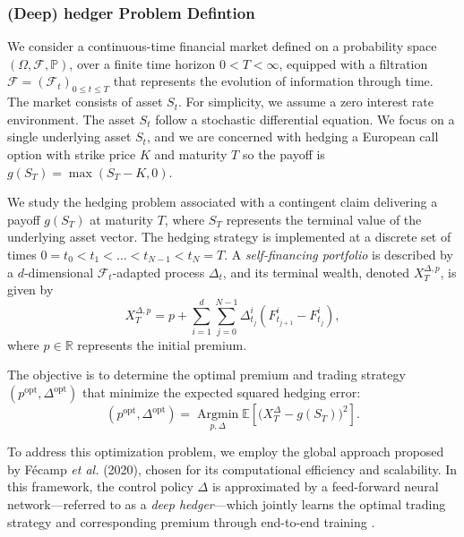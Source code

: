     \subsubsection{(Deep) hedger Problem Defintion}
      We consider a continuous-time financial market defined on a 
      probability space $(\Omega, \mathcal{F}, \mathbb{P})$, over 
      a finite time horizon $0 < T < \infty$, equipped with a 
      filtration $\mathcal{F} = (\mathcal{F}_t)_{0 \leq t \leq T}$ 
      that represents the evolution of information through time.  
      The market consists of asset $S_t$. For simplicity, we assume a zero 
      interest rate environment.
      The asset \(S_t\) follow a stochastic differential
      equation. We focus on a single underlying asset \(S_t\), and we are
      concerned with hedging a European call option with strike price \(K\)
      and maturity \(T\) so the payoff is \(g(S_T) = \max(S_T - K, 0)\).

      We study the hedging problem associated with a contingent 
      claim delivering a payoff $g(S_T)$ at maturity $T$, where 
      $S_T$ represents the terminal value of the underlying asset 
      vector.  
      The hedging strategy is implemented at a discrete set of 
      times $0 = t_0 < t_1 < \dots < t_{N-1} < t_N = T$.  
      A \textit{self-financing portfolio} is described by a 
      $d$-dimensional $\mathcal{F}_t$-adapted process $\Delta_t$, 
      and its terminal wealth, denoted $X_T^{\Delta, p}$, is 
      given by
      \begin{equation}
          X_T^{\Delta, p} = p + \sum_{i=1}^{d} \sum_{j=0}^{N-1} 
          \Delta_{t_j}^i \left( F_{t_{j+1}}^i - F_{t_j}^i \right),
      \end{equation}
      where $p \in \mathbb{R}$ represents the initial premium.

      The objective is to determine the optimal premium and 
      trading strategy $(p^{\text{opt}}, \Delta^{\text{opt}})$ 
      that minimize the expected squared hedging error:
      \begin{equation}
          (p^{\text{opt}}, \Delta^{\text{opt}}) 
          = \operatorname*{Argmin}_{p, \Delta} 
          \mathbb{E} \left[ \big( X_T^{\Delta} - g(S_T) 
          \big)^2 \right].
      \end{equation}

      To address this optimization problem, we employ the global 
      approach proposed by Fécamp \textit{et al.} (2020), chosen 
      for its computational efficiency and scalability.  
      In this framework, the control policy $\Delta$ is 
      approximated by a feed-forward neural network—referred to as 
      a \textit{deep hedger}—which jointly learns the optimal 
      trading strategy and corresponding premium through 
      end-to-end training \cite{Fecamp20}.

